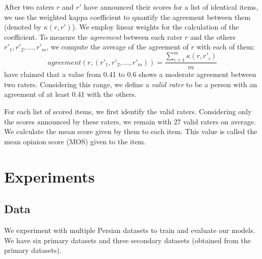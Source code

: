 \documentclass{article}
\begin{document}
\begin{enumerate}
	After two raters $r$ and $r'$ have announced their scores for a list of identical items, we use the weighted kappa coefficient \citep{cohen1968weighted} to quantify the agreement between them (denoted by $\kappa(r,r')$). We employ linear weights \citep{cicchetti1971new} for the calculation of the coefficient. To measure the \textit{agreement} between each rater $r$ and the others $r'_1,r'_2,\dots,r'_m$, we compute the average of the agreement of $r$ with each of them:
	\begin{equation}
	agreement(r, (r'_1,r'_2,\dots,r'_m)) = \frac{\sum_{i=1}^{m} \kappa(r,r'_i)}{m}
	\label{eq:agreement-score}
	\end{equation}
	\citet{landis1977measurement} have claimed that a value from 0.41 to 0.6 shows a moderate agreement between two raters. Considering this range, we define a \textit{valid rater} to be a person with an agreement of at least 0.41 with the others.
	
	For each list of scored items, we first identify the valid raters. Considering only the scores announced by these raters, we remain with 27 valid raters on average. We calculate the mean score given by them to each item. This value is called the mean opinion score (MOS) given to the item.
\end{enumerate}

\section{Experiments \label{sec:experiments}}
\subsection{Data}
We experiment with multiple Persian datasets to train and evaluate our models.
We have six primary datasets and three secondary datasets (obtained from the primary datasets).
\end{document}
